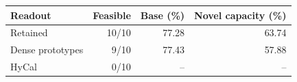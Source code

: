 \begin{tabular}{@{}lrrr@{}}
\toprule
Readout & Feasible & Base (\%) & Novel capacity (\%) \\
\midrule
Retained & 10/10 & 77.28 & 63.74 \\
Dense prototypes & 9/10 & 77.43 & 57.88 \\
HyCal & 0/10 & -- & -- \\
\bottomrule
\end{tabular}
